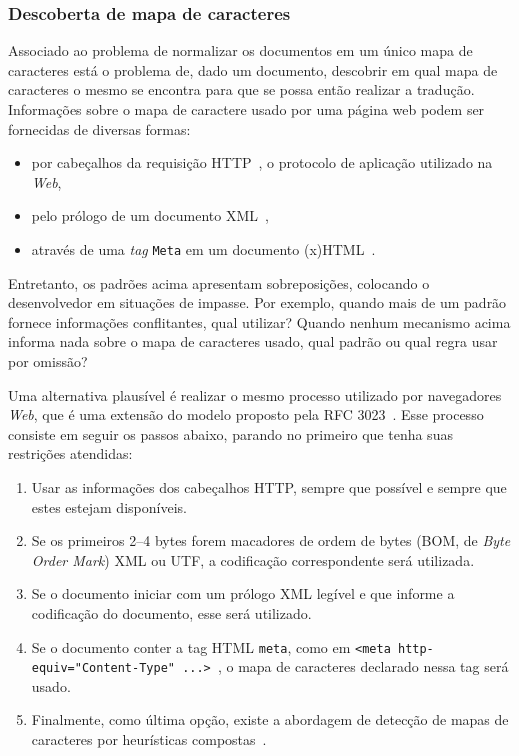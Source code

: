 \documentclass[10pt,twocolumn]{article}
\begin{document}
\subsubsection{Descoberta de mapa de
caracteres}\label{prob:charmapdetection}

Associado ao problema de normalizar os documentos em um único mapa de
caracteres está o problema de, dado um documento, descobrir em qual mapa
de caracteres o mesmo se encontra para que se possa então realizar a
tradução. Informações sobre o mapa de caractere usado por uma página web
podem ser fornecidas de diversas formas:
\begin{itemize}
\item por cabeçalhos da requisição HTTP~\cite{rfc2616},
 o protocolo de aplicação utilizado na \emph{Web},
\item pelo prólogo de um documento XML~\cite{bray2006xml},
\item através de uma \emph{tag} \texttt{Meta} em um documento
(x)HTML~\cite{html4tr}.
\end{itemize}

Entretanto, os padrões acima apresentam sobreposições, colocando o
desenvolvedor em situações de impasse. Por exemplo, quando mais de um
padrão fornece informações conflitantes, qual utilizar?  Quando nenhum
mecanismo acima informa nada sobre o mapa de caracteres usado, qual
padrão ou qual regra usar por omissão?

%

Uma alternativa plausível é realizar o mesmo processo utilizado por
navegadores \emph{Web}, que é uma extensão do modelo proposto pela RFC
3023~\cite{rfc3023}. Esse processo consiste em seguir os passos abaixo,
parando no primeiro que tenha suas restrições atendidas:
\begin{enumerate}
\item Usar as informações dos cabeçalhos HTTP, sempre que possível e
sempre que estes estejam disponíveis.
\item  Se os primeiros 2--4 bytes forem macadores de ordem de bytes
(BOM, de \emph{Byte Order Mark}) XML ou UTF, a codificação
correspondente será utilizada.
\item Se o documento iniciar com um prólogo XML legível e que informe a
codificação do documento, esse será utilizado.
\item Se o documento conter a tag HTML \texttt{meta}, como em \texttt{<meta
http-equiv="Content-Type" ...> }, o mapa de caracteres declarado nessa
tag será usado.
\item Finalmente, como última opção, existe a abordagem de detecção de
mapas de caracteres por heurísticas compostas~\cite{mozillaiuc}.
\end{enumerate}
\end{document}
